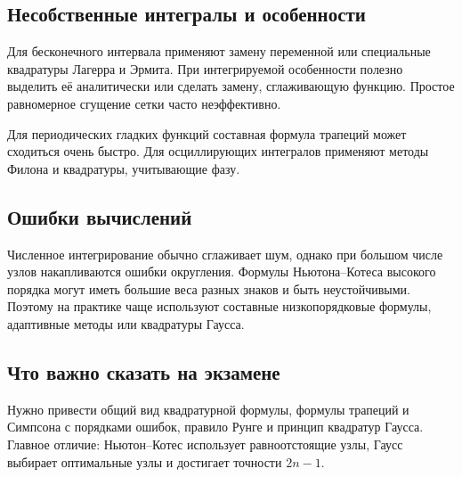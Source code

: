 \subsection{Несобственные интегралы и особенности}

Для бесконечного интервала применяют замену переменной или специальные
квадратуры Лагерра и Эрмита. При интегрируемой особенности полезно выделить её
аналитически или сделать замену, сглаживающую функцию. Простое равномерное
сгущение сетки часто неэффективно.

Для периодических гладких функций составная формула трапеций может сходиться
очень быстро. Для осциллирующих интегралов применяют методы Филона и квадратуры,
учитывающие фазу.

\subsection{Ошибки вычислений}

Численное интегрирование обычно сглаживает шум, однако при большом числе узлов
накапливаются ошибки округления. Формулы Ньютона--Котеса высокого порядка могут
иметь большие веса разных знаков и быть неустойчивыми. Поэтому на практике чаще
используют составные низкопорядковые формулы, адаптивные методы или квадратуры
Гаусса.

\subsection{Что важно сказать на экзамене}

Нужно привести общий вид квадратурной формулы, формулы трапеций и Симпсона с
порядками ошибок, правило Рунге и принцип квадратур Гаусса. Главное отличие:
Ньютон--Котес использует равноотстоящие узлы, Гаусс выбирает оптимальные узлы и
достигает точности $2n-1$.

\newpage